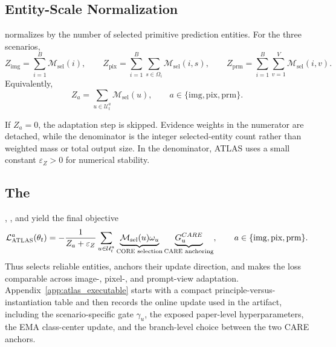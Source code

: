 \subsection{Entity-Scale Normalization}

\sane{} normalizes by the number of selected primitive prediction entities.
For the three scenarios,
\begin{equation}
Z_{\mathrm{img}}
=
\sum_{i=1}^{B}\mathcal{M}_{\mathrm{sel}}(i),
\qquad
Z_{\mathrm{pix}}
=
\sum_{i=1}^{B}\sum_{s\in\Omega_i}\mathcal{M}_{\mathrm{sel}}(i,s),
\qquad
Z_{\mathrm{prm}}
=
\sum_{i=1}^{B}\sum_{v=1}^{V}\mathcal{M}_{\mathrm{sel}}(i,v).
\label{eq:sane_three_cases}
\end{equation}
Equivalently,
\begin{equation}
Z_a
=
\sum_{u\in\mathcal{U}_t^a}
\mathcal{M}_{\mathrm{sel}}(u),
\qquad
a\in\{\mathrm{img},\mathrm{pix},\mathrm{prm}\}.
\label{eq:sane_unified}
\end{equation}

If $Z_a=0$, the adaptation step is skipped. Evidence weights in the numerator
are detached, while the denominator is the integer selected-entity count rather
than weighted mass or total output size. In the denominator, ATLAS uses a small
constant $\varepsilon_Z>0$ for numerical stability.

\subsection{The \atlasloss{}}

\core{}, \care{}, and \sane{} yield the final objective
\begin{equation}
\mathcal{L}_{\text{\textsc{ATLAS}}}^{a}(\theta_t)
=
-\frac{1}{Z_a+\varepsilon_Z}
\sum_{u\in\mathcal{U}_t^a}
\underbrace{
\mathcal{M}_{\mathrm{sel}}(u)\omega_u
}_{\text{\textsc{CORE}{} selection}}
\underbrace{
G_{\mathrm{u}}^{CARE}
}_{\text{\textsc{CARE}{} anchoring}},
\qquad
a\in\{\mathrm{img},\mathrm{pix},\mathrm{prm}\}.
\label{eq:atlas_loss}
\end{equation}
Thus \core{} selects reliable entities, \care{} anchors their update direction, and \sane{} makes the loss comparable across image-, pixel-, and prompt-view adaptation. Appendix~\ref{app:atlas_executable} starts with a compact principle-versus-instantiation table and then records the online update used in the artifact, including the scenario-specific gate $\gamma_u$, the exposed paper-level hyperparameters, the EMA class-center update, and the branch-level choice between the two CARE anchors.

